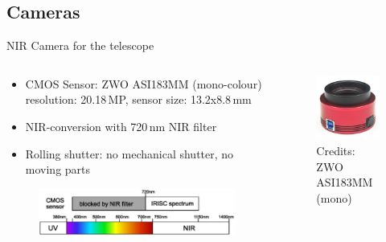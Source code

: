 \documentclass[11pt, aspectratio=169]{beamer}
\begin{document}
\subsection{Cameras} 			%
\begin{frame}{NIR Camera for the telescope}
\vspace{-0.2cm}
\begin{columns}[t]
\begin{column}{0.6\textwidth}
	\begin{itemize}
		\item CMOS Sensor: ZWO ASI183MM (mono-colour) \\
			resolution: 20.18\,MP, sensor size: 13.2x8.8\,mm
		\item NIR-conversion with 720\,nm NIR filter
		\item Rolling shutter: no mechanical shutter, no moving parts
	\end{itemize}
	\vspace{-0.7cm}
	\begin{figure}
	\centering
	\includegraphics[width = 1.1\linewidth]{figures/images/IRISC_spectrum.eps}
\end{figure}
\end{column}
\begin{column}{0.4\textwidth}
	\begin{figure}[t]
		\centering
		\includegraphics[width=0.7\linewidth]{figures/images/ZWO_ASI183MM.jpg}
		\caption*{Credits: ZWO ASI183MM (mono)}
		\label{fig::NIR_sensor}
	\end{figure}
\end{column}
\end{columns}
\end{frame}
\end{document}
